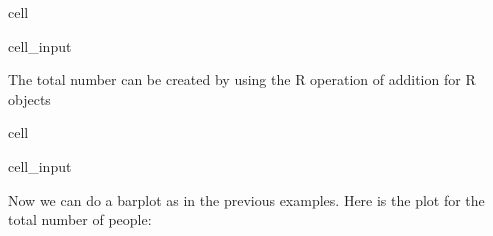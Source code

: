 \documentclass[letterpaper,10pt,english]{jupyterBook}
\begin{document}
\begin{sphinxuseclass}{cell}
\begin{sphinxVerbatimInput}
\begin{sphinxuseclass}{cell_input}
\begin{sphinxVerbatim}[commandchars=\\\{\}]
\end{sphinxVerbatim}

\end{sphinxuseclass}\end{sphinxVerbatimInput}

\end{sphinxuseclass}
\sphinxAtStartPar
The total number can be created by using the R operation of addition for R objects

\begin{sphinxuseclass}{cell}\begin{sphinxVerbatimInput}

\begin{sphinxuseclass}{cell_input}
\begin{sphinxVerbatim}[commandchars=\\\{\}]
\end{sphinxVerbatim}

\end{sphinxuseclass}\end{sphinxVerbatimInput}

\end{sphinxuseclass}
\sphinxAtStartPar
Now we can do a barplot as in the previous examples. Here is the plot for the total number of people:
\end{document}
